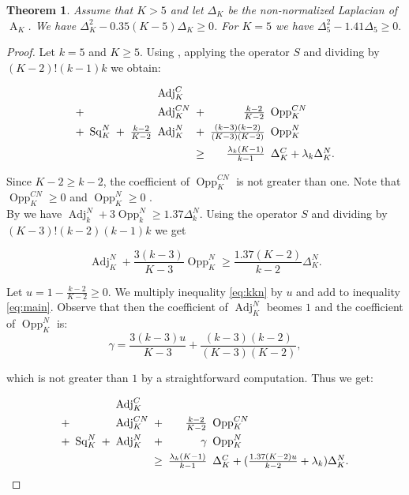 \documentclass[12pt]{amsart}
\newtheorem{theorem}{Theorem}[section]
\theoremstyle{definition}
\numberwithin{figure}{section}
\numberwithin{table}{section}
\numberwithin{equation}{section}
\newcommand{\A}{\operatorname{A}}
\newcommand{\Adj}{\operatorname{Adj}}
\newcommand{\Sq}{\operatorname{Sq}}
\newcommand{\Opp}{\operatorname{Opp}}
\begin{document}
\begin{theorem}\label{t:sos}
Assume that $K > 5$ and let $\Delta_K$ be the non-normalized Laplacian of $\A_K$. We have $\Delta_K^2 - 0.35(K-5)\Delta_K \geq 0$. For $K=5$ we have $\Delta_5^2 - 1.41\Delta_5 \geq 0.$
\end{theorem}

\begin{proof}

Let $k=5$ and $K \geq 5$. Using , applying the operator $S$ and dividing by $(K-2)!(k-1)k$ we obtain:


\begin{equation}
\begin{array}{l@{\hskip 5pt}c@{\hskip 5pt}r@{\hskip 5pt}c@{\hskip 5pt}l@{\hskip 5pt}r@{\hskip 5pt}r@{\hskip 5pt}l@{\hskip 5pt}}
&&&&\Adj_K^{C}\\[0.4em]
+&&&&\Adj_K^{CN}&+&\frac{k-2}{K-2}&\Opp_K^{CN}\\[0.4em]
+&\Sq_K^{N}&+&\frac{k-2}{K-2} &\Adj_K^{N}&+&\frac{(k-3)(k-2)}{(K-3)(K-2)}& \Opp_K^{N} \\[0.6em]
&&&&&\geq &\frac{\lambda_k (K-1)}{k-1}&\Delta_K^C+\lambda_k\Delta_K^N. 
\end{array}
\label{eq:main}
\end{equation}

Since $K-2 \geq k-2$, the coefficient of $\Opp_K^{CN}$ is not greater than one. Note that $\Opp_K^{CN} \geq 0$ and $\Opp_K^N \geq 0$ \cite[Lemma 3.6]{MR4224715}.\\

By \cite[Remark 5.8]{MR4224715} we have  $\Adj_k^N + 3\Opp_k^N \geq 1.37\Delta_k^N$. Using the operator $S$ and dividing by $(K-3)!(k-2)(k-1)k$ we get 

\begin{equation}
\Adj_K^N + \frac{3(k-3)}{K-3}\Opp_K^N  \geq \frac{1.37(K-2)}{k-2}\Delta_K^N.
\label{eq:kkn}
\end{equation}

Let $u = 1 - \frac{k-2}{K-2} \geq 0$. We multiply inequality \ref{eq:kkn} by $u$ and add to inequality \ref{eq:main}. Observe that then the coefficient of $\Adj_K^N$ beomes $1$ and the coefficient of $\Opp_K^N$ is: 
$$\gamma = \frac{3(k-3)u}{K-3} +\frac{(k-3)(k-2)}{(K-3)(K-2)},$$ 

which is not greater than $1$ by a straightforward computation. Thus we get:

\[
\begin{array}{r@{\hskip 5pt}c@{\hskip 5pt}l@{\hskip 5pt}l@{\hskip 5pt}l@{\hskip 5pt}r@{\hskip 5pt}l}
&&&\Adj_K^{C}\\[0.4em]
+&&&\Adj_K^{CN}  & + & \frac{k-2}{K-2}&\Opp_K^{CN} \\[0.4em]
+& \Sq_K^{N}   & + & \Adj_K^{N}&+&\gamma &\Opp_K^{N} \\[0.4em]
&& && \geq&  \frac{\lambda_k (K-1)}{k-1}&\Delta_K^C + (\frac{1.37 (K-2)u}{k-2}+\lambda_k)\Delta_K^N.
\end{array}
\]


\end{proof}
\end{document}
